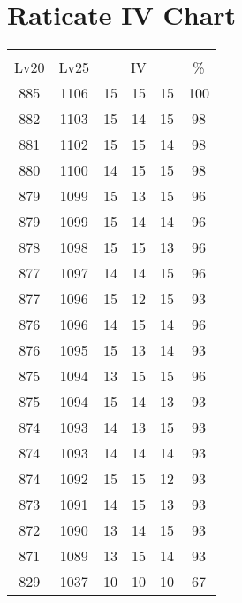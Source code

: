 \documentclass{article}%
\begin{document}
%
\normalsize%
\section{Raticate IV Chart}%
\label{sec:Raticate IV Chart}%
\renewcommand{\arraystretch}{1.5}%
\begin{tabular}{|c|c|c|c|c|c|}%
\hline%
\multicolumn{6}{|c|}{\textcolor{white}{ 
\linebreak{Raticate}
}%
\cellcolor{black}}\\%
\multicolumn{1}{|c}{Lv20}&\multicolumn{1}{c|}{Lv25}&\multicolumn{3}{c|}{IV}&\multicolumn{1}{|c|}{\%}\\%
\hline%
\rowcolor{color100}%
885&1106&15&15&15&100\\%
\hline%
\rowcolor{color98}%
882&1103&15&14&15&98\\%
\hline%
\rowcolor{color98}%
881&1102&15&15&14&98\\%
\hline%
\rowcolor{color98}%
880&1100&14&15&15&98\\%
\hline%
\rowcolor{color96}%
879&1099&15&13&15&96\\%
\hline%
\rowcolor{color96}%
879&1099&15&14&14&96\\%
\hline%
\rowcolor{color96}%
878&1098&15&15&13&96\\%
\hline%
\rowcolor{color96}%
877&1097&14&14&15&96\\%
\hline%
\rowcolor{color93}%
877&1096&15&12&15&93\\%
\hline%
\rowcolor{color96}%
876&1096&14&15&14&96\\%
\hline%
\rowcolor{color93}%
876&1095&15&13&14&93\\%
\hline%
\rowcolor{color96}%
875&1094&13&15&15&96\\%
\hline%
\rowcolor{color93}%
875&1094&15&14&13&93\\%
\hline%
\rowcolor{color93}%
874&1093&14&13&15&93\\%
\hline%
\rowcolor{color93}%
874&1093&14&14&14&93\\%
\hline%
\rowcolor{color93}%
874&1092&15&15&12&93\\%
\hline%
\rowcolor{color93}%
873&1091&14&15&13&93\\%
\hline%
\rowcolor{color93}%
872&1090&13&14&15&93\\%
\hline%
\rowcolor{color93}%
871&1089&13&15&14&93\\%
\hline%
\rowcolor{color91}%
829&1037&10&10&10&67\\%
\end{tabular}

%
\end{document}
